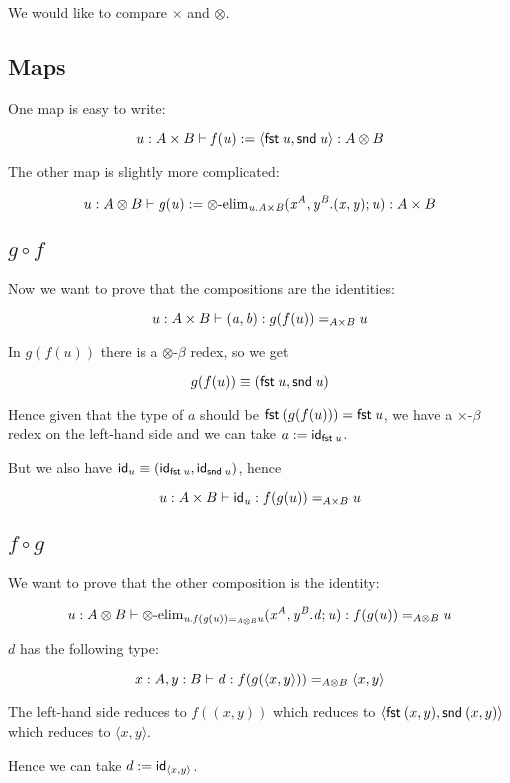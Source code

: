 We would like to compare $\times$ and $\otimes$.

\subsection{Maps}

One map is easy to write:

\[\ofglob{u:A\times B}{f(u):=\langle\fst u,\snd u\rangle}{A\otimes B}\]

The other map is slightly more complicated:

\[\ofglob{u:A\otimes B}{g(u):=\otimes\text{-elim}_{u.A\times B}
  (x^A,y^B.(x,y); u)}{A\times B}\]

\subsection{$g \circ f$}

Now we want to prove that the compositions are the identities:

\[\ofglob{u:A\times B}{(a,b)}{\homj{A\times B}{g(f(u))}{u}}\]

In $g(f(u))$ there is a $\otimes$-$\beta$ redex, so we get

\[g(f(u))\equiv (\fst u,\snd u)\]

Hence given that the type of $a$ should be $\fst(g(f(u)))=\fst u$, we have
a $\times$-$\beta$ redex on the left-hand side and we can take $a:=\id{\fst u}$.

But we also have $\id{u}\equiv(\id{\fst u},\id{\snd u})$, hence

\[\ofglob{u:A\times B}{\id{u}}{\homj{A\times B}{f(g(u))}{u}}\]

\subsection{$f\circ g$}

We want to prove that the other composition is the identity:

\[\ofglob{u:A\otimes B}{\otimes\text{-elim}_{u.\homj{A\otimes B}{f(g(u))}{u}}
  (x^A,y^B.d;u)}{\homj{A\otimes B}{f(g(u))}{u}}\]

$d$ has the following type:

\[\ofglob{x:A,y:B}{d}{\homj{A\otimes B}{f(g(\langle x,y\rangle))}
  {\langle x,y\rangle}}\]

The left-hand side reduces to $f((x,y))$ which reduces to
$\langle\fst(x,y),\snd(x,y)\rangle$ which reduces to $\langle x,y\rangle$.

Hence we can take $d:=\id{\langle x,y\rangle}$.


